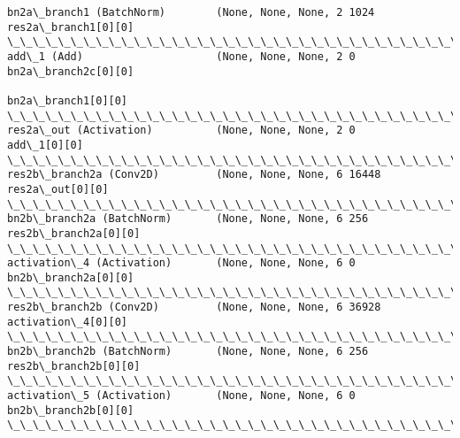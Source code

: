 \documentclass[11pt]{article}
\begin{document}
\begin{Verbatim}[commandchars=\\\{\}]
bn2a\_branch1 (BatchNorm)        (None, None, None, 2 1024        res2a\_branch1[0][0]              
\_\_\_\_\_\_\_\_\_\_\_\_\_\_\_\_\_\_\_\_\_\_\_\_\_\_\_\_\_\_\_\_\_\_\_\_\_\_\_\_\_\_\_\_\_\_\_\_\_\_\_\_\_\_\_\_\_\_\_\_\_\_\_\_\_\_\_\_\_\_\_\_\_\_\_\_\_\_\_\_\_\_\_\_\_\_\_\_\_\_\_\_\_\_\_\_\_\_
add\_1 (Add)                     (None, None, None, 2 0           bn2a\_branch2c[0][0]              
                                                                 bn2a\_branch1[0][0]               
\_\_\_\_\_\_\_\_\_\_\_\_\_\_\_\_\_\_\_\_\_\_\_\_\_\_\_\_\_\_\_\_\_\_\_\_\_\_\_\_\_\_\_\_\_\_\_\_\_\_\_\_\_\_\_\_\_\_\_\_\_\_\_\_\_\_\_\_\_\_\_\_\_\_\_\_\_\_\_\_\_\_\_\_\_\_\_\_\_\_\_\_\_\_\_\_\_\_
res2a\_out (Activation)          (None, None, None, 2 0           add\_1[0][0]                      
\_\_\_\_\_\_\_\_\_\_\_\_\_\_\_\_\_\_\_\_\_\_\_\_\_\_\_\_\_\_\_\_\_\_\_\_\_\_\_\_\_\_\_\_\_\_\_\_\_\_\_\_\_\_\_\_\_\_\_\_\_\_\_\_\_\_\_\_\_\_\_\_\_\_\_\_\_\_\_\_\_\_\_\_\_\_\_\_\_\_\_\_\_\_\_\_\_\_
res2b\_branch2a (Conv2D)         (None, None, None, 6 16448       res2a\_out[0][0]                  
\_\_\_\_\_\_\_\_\_\_\_\_\_\_\_\_\_\_\_\_\_\_\_\_\_\_\_\_\_\_\_\_\_\_\_\_\_\_\_\_\_\_\_\_\_\_\_\_\_\_\_\_\_\_\_\_\_\_\_\_\_\_\_\_\_\_\_\_\_\_\_\_\_\_\_\_\_\_\_\_\_\_\_\_\_\_\_\_\_\_\_\_\_\_\_\_\_\_
bn2b\_branch2a (BatchNorm)       (None, None, None, 6 256         res2b\_branch2a[0][0]             
\_\_\_\_\_\_\_\_\_\_\_\_\_\_\_\_\_\_\_\_\_\_\_\_\_\_\_\_\_\_\_\_\_\_\_\_\_\_\_\_\_\_\_\_\_\_\_\_\_\_\_\_\_\_\_\_\_\_\_\_\_\_\_\_\_\_\_\_\_\_\_\_\_\_\_\_\_\_\_\_\_\_\_\_\_\_\_\_\_\_\_\_\_\_\_\_\_\_
activation\_4 (Activation)       (None, None, None, 6 0           bn2b\_branch2a[0][0]              
\_\_\_\_\_\_\_\_\_\_\_\_\_\_\_\_\_\_\_\_\_\_\_\_\_\_\_\_\_\_\_\_\_\_\_\_\_\_\_\_\_\_\_\_\_\_\_\_\_\_\_\_\_\_\_\_\_\_\_\_\_\_\_\_\_\_\_\_\_\_\_\_\_\_\_\_\_\_\_\_\_\_\_\_\_\_\_\_\_\_\_\_\_\_\_\_\_\_
res2b\_branch2b (Conv2D)         (None, None, None, 6 36928       activation\_4[0][0]               
\_\_\_\_\_\_\_\_\_\_\_\_\_\_\_\_\_\_\_\_\_\_\_\_\_\_\_\_\_\_\_\_\_\_\_\_\_\_\_\_\_\_\_\_\_\_\_\_\_\_\_\_\_\_\_\_\_\_\_\_\_\_\_\_\_\_\_\_\_\_\_\_\_\_\_\_\_\_\_\_\_\_\_\_\_\_\_\_\_\_\_\_\_\_\_\_\_\_
bn2b\_branch2b (BatchNorm)       (None, None, None, 6 256         res2b\_branch2b[0][0]             
\_\_\_\_\_\_\_\_\_\_\_\_\_\_\_\_\_\_\_\_\_\_\_\_\_\_\_\_\_\_\_\_\_\_\_\_\_\_\_\_\_\_\_\_\_\_\_\_\_\_\_\_\_\_\_\_\_\_\_\_\_\_\_\_\_\_\_\_\_\_\_\_\_\_\_\_\_\_\_\_\_\_\_\_\_\_\_\_\_\_\_\_\_\_\_\_\_\_
activation\_5 (Activation)       (None, None, None, 6 0           bn2b\_branch2b[0][0]              
\_\_\_\_\_\_\_\_\_\_\_\_\_\_\_\_\_\_\_\_\_\_\_\_\_\_\_\_\_\_\_\_\_\_\_\_\_\_\_\_\_\_\_\_\_\_\_\_\_\_\_\_\_\_\_\_\_\_\_\_\_\_\_\_\_\_\_\_\_\_\_\_\_\_\_\_\_\_\_\_\_\_\_\_\_\_\_\_\_\_\_\_\_\_\_\_\_\_

\end{Verbatim}
\end{document}
